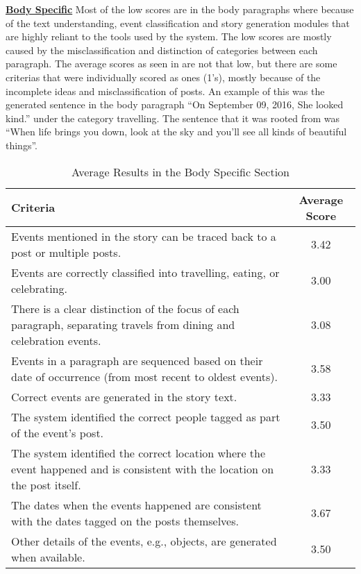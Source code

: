 \underline{\textbf{Body Specific}}
Most of the low scores are in the body paragraphs where because of the text understanding, event classification and story generation modules that are highly reliant to the tools used by the system. The low scores are mostly caused by the misclassification and distinction of categories between each paragraph. The average scores as seen in  are not that low, but there are some criterias that were individually scored as ones (1’s), mostly because of the incomplete ideas and misclassification of posts. An example of this was the generated sentence in the body paragraph “On September 09, 2016, She looked kind.” under the category travelling. The sentence that it was rooted from was “When life brings you down, look at the sky and you'll see all kinds of beautiful things”.

\begin{table}[ph!]   %
	\centering
	\caption{Average Results in the Body Specific Section} \vspace{0.25em}
	\begin{tabular}{|p{2.5in}|c|} \hline
		\centering Criteria & Average Score \\ \hline
		Events mentioned in the story can be traced back to a post or multiple posts. & 3.42 \\ \hline
		Events are correctly classified into travelling, eating, or celebrating. & 3.00 \\ \hline
		There is a clear distinction of the focus of each paragraph, separating travels from dining and celebration events. & 3.08 \\ \hline
		Events in a paragraph are sequenced based on their date of occurrence (from most recent to oldest events). & 3.58 \\ \hline
		Correct events are generated in the story text. & 3.33 \\ \hline
		The system identified the correct people tagged as part of the event’s post. & 3.50 \\ \hline
		The system identified the correct location where the event happened and is consistent with the location on the post itself. & 3.33 \\ \hline
		The dates when the events happened are consistent with the dates tagged on the posts themselves. & 3.67 \\ \hline
		Other details of the events, e.g., objects, are generated when available. & 3.50 \\ \hline
	\end{tabular}
	\label{tab:criteria3}
\end{table}

